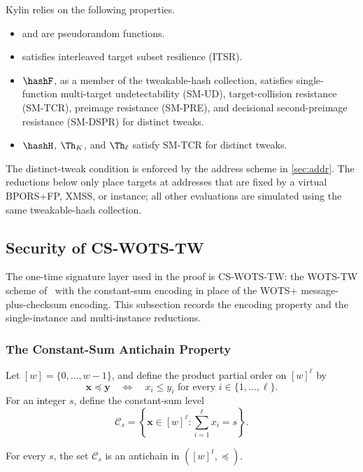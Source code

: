 Kylin relies on the following properties.
\begin{itemize}
    \item \PRF and \PRFmsg are pseudorandom functions.
    \item \hashmsg satisfies interleaved target subset resilience (ITSR).
    \item $\hashF$, as a member of the tweakable-hash collection, satisfies
    single-function multi-target undetectability (SM-UD), target-collision
    resistance (SM-TCR), preimage resistance (SM-PRE), and decisional
    second-preimage resistance (SM-DSPR) for distinct tweaks.
    \item $\hashH$, $\Th_K$, and $\Th_\ell$ satisfy SM-TCR for distinct tweaks.
\end{itemize}

The distinct-tweak condition is enforced by the address scheme in
\cref{sec:addr}.  The reductions below only place targets at addresses that
are fixed by a virtual BPORS+FP, XMSS, or \WOTSCS instance; all other evaluations
are simulated using the same tweakable-hash collection.

\subsection{Security of CS-WOTS-TW}
\label{sec:proof-cswots}

The one-time signature layer used in the proof is CS-WOTS-TW: the WOTS-TW
scheme of~\cite{AC:HulKud22} with the \WOTSCS constant-sum encoding in place
of the WOTS+ message-plus-checksum encoding.  This subsection records the
encoding property and the single-instance and multi-instance reductions.

\subsubsection{The Constant-Sum Antichain Property}
\label{sec:proof-antichain}

Let $[w]=\{0,\ldots,w-1\}$, and define the product partial order on
$[w]^\ell$ by
\[
    \mathbf{x}\preceq\mathbf{y}
    \quad\Longleftrightarrow\quad
    x_i\le y_i\text{ for every }i\in\{1,\ldots,\ell\}.
\]
For an integer $s$, define the constant-sum level
\[
    \mathcal{C}_s
    =\left\{\mathbf{x}\in [w]^\ell:\sum_{i=1}^{\ell}x_i=s\right\}.
\]

\begin{lemma}
\label{lem:proof-antichain}
For every $s$, the set $\mathcal{C}_s$ is an antichain in
$([w]^\ell,\preceq)$.
\end{lemma}

